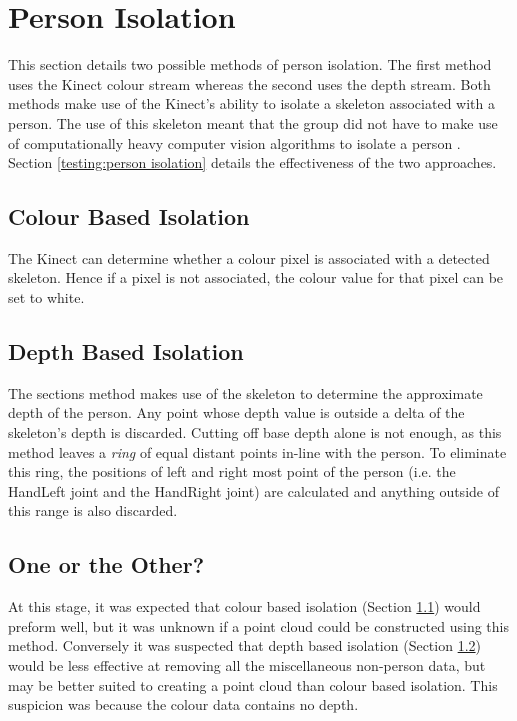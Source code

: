 \section{Person Isolation}
\label{design:person isolation}
This section details two possible methods of person isolation.
The first method uses the Kinect colour stream whereas the second uses the depth stream.
Both methods make use of the Kinect's ability to isolate a skeleton associated with a person.
The use of this skeleton meant that the group did not have to make use of computationally heavy computer vision algorithms to isolate a person .\\

Section \ref{testing:person isolation} details the effectiveness of the two approaches.

\subsection{Colour Based Isolation}
\label{design:colour based isolation}
The Kinect can determine whether a colour pixel is associated with a detected skeleton. Hence if a pixel is not associated, the colour value for that pixel can be set to white.\\

\subsection{Depth Based Isolation}
\label{design:depth based isolation}
The sections method makes use of the skeleton to determine the approximate depth of the person. 
Any point whose depth value is outside a delta of the skeleton's depth is discarded.
Cutting off base depth alone is not enough, as this method leaves a \textit{ring} of equal distant points in-line with the person. 
To eliminate this ring, the positions of left and right most point of the person (i.e. the HandLeft joint and the HandRight joint) are calculated and anything outside of this range is also discarded. \\

\subsection{One or the Other?}
\label{design:one or the other?}
At this stage, it was expected that colour based isolation (Section \ref{design:colour based isolation}) would preform well, but it was unknown if a point cloud could be constructed using this method. 
Conversely it was suspected that depth based isolation (Section \ref{design:depth based isolation}) would be less effective at removing all the miscellaneous non-person data, but may be better suited to creating a point cloud than colour based isolation. This suspicion was because the colour data contains no depth.\\ 